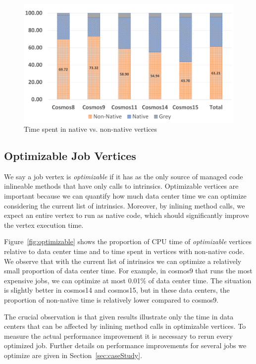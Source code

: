 \begin{figure}[ht]
\includegraphics[scale = 0.7]{graphs/proportions}
\caption{Time spent in native vs. non-native vertices}
\label{fig:nativeVsNonNative}
\end{figure}

\subsection{Optimizable Job Vertices}


We say a job vertex is \emph{optimizable} if it has as the only source of managed code inlineable methods that have only calls to intrinsics. 
Optimizable vertices are important because we can quantify how much data center time we can optimize considering the current list of intrinsics. 
Moreover, by inlining method calls, we expect an entire vertex to run as native code, which should significantly improve the vertex execution time.

Figure~\ref{fig:optimizable} shows the proportion of CPU time of \emph{optimizable} vertices relative to data center time and to time spent in vertices with non-native code. 
We observe that with the current list of intrinsics we can optimize a relatively small proportion of data center time. 
For example, in cosmos9 that runs the most expensive jobs, we can optimize at most 0.01\% of data center time. 
The situation is slightly better in cosmos14 and cosmos15, but in these data centers, the proportion of non-native time is relatively lower compared to cosmos9.

The crucial observation is that given results illustrate only the time in data centers that can be affected by inlining method calls in optimizable vertices. 
To measure the actual performance improvement it is necessary to rerun every optimized job. 
Further details on performance improvements for several jobs we optimize are given in Section~\ref{sec:caseStudy}.

